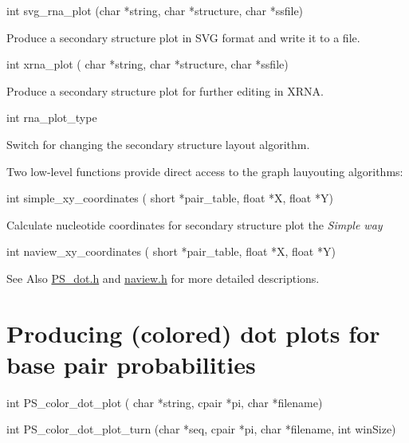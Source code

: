 \begin{DoxyVerb}int svg_rna_plot (char *string,
                  char *structure,
                  char *ssfile)
\end{DoxyVerb}
 Produce a secondary structure plot in S\-V\-G format and write it to a file.

\begin{DoxyVerb}int xrna_plot ( char *string,
                char *structure,
                char *ssfile)
\end{DoxyVerb}
 Produce a secondary structure plot for further editing in X\-R\-N\-A.

\begin{DoxyVerb}int rna_plot_type
\end{DoxyVerb}
 Switch for changing the secondary structure layout algorithm.

Two low-\/level functions provide direct access to the graph lauyouting algorithms\-:

\begin{DoxyVerb}int simple_xy_coordinates ( short *pair_table,
                            float *X,
                            float *Y)
\end{DoxyVerb}
 Calculate nucleotide coordinates for secondary structure plot the {\itshape Simple way}

\begin{DoxyVerb}int naview_xy_coordinates ( short *pair_table,
                            float *X,
                            float *Y)
\end{DoxyVerb}


\begin{DoxySeeAlso}{See Also}
\hyperlink{PS__dot_8h}{P\-S\-\_\-dot.\-h} and \hyperlink{naview_8h}{naview.\-h} for more detailed descriptions.
\end{DoxySeeAlso}
\hypertarget{mp_utils_utils_dot}{}\section{Producing (colored) dot plots for base pair probabilities}\label{mp_utils_utils_dot}
\begin{DoxyVerb}int PS_color_dot_plot ( char *string,
                        cpair *pi,
                        char *filename)
\end{DoxyVerb}


\begin{DoxyVerb}int PS_color_dot_plot_turn (char *seq,
                            cpair *pi,
                            char *filename,
                            int winSize)
\end{DoxyVerb}


